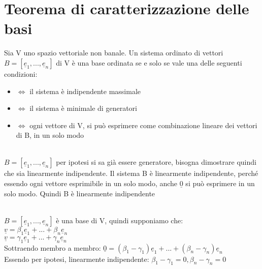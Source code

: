 \section{Teorema di caratterizzazione delle basi}
\begin{teorema}
	Sia V uno spazio vettoriale non banale. Un sistema ordinato di vettori $B=[\underline{e}_1,...,\underline{e}_n]$ di V è una base ordinata se e solo se vale una delle seguenti condizioni:
	\begin{itemize}
		\item $\Longleftrightarrow$ il sistema è indipendente massimale
		\item $\Longleftrightarrow$ il sistema è minimale di generatori
		\item $\Longleftrightarrow$ ogni vettore di V, si può esprimere come combinazione lineare dei vettori di B, in un solo modo
	\end{itemize}
	\begin{dimostrazione}
		\phantom{}\\
		$B=[\underline{e}_1,...,\underline{e}_n]$ per ipotesi si sa già essere generatore, bisogna dimostrare quindi che sia linearmente indipendente. Il sistema B è linearmente indipendente, perché essendo ogni vettore esprimibile in un solo modo, anche $\underline{0}$ si può esprimere in un solo modo. Quindi B è linearmente indipendente
	\end{dimostrazione}
	\begin{dimostrazione}
		\phantom{}\\
		$B=[\underline{e}_1,...,\underline{e}_n]$ è una base di V, quindi supponiamo che:\\
		$\underline{v}=\beta_1 \underline{e}_1+...+\beta_n \underline{e}_n$\\
		$\underline{v}=\gamma_1 \underline{e}_1+...+\gamma_n \underline{e}_n$\\
		Sottraendo membro a membro: $\underline{0}=(\beta_1-\gamma_1)\underline{e}_1+...+(\beta_n-\gamma_n)\underline{e}_n$\\
		Essendo per ipotesi, linearmente indipendente: $\beta_1-\gamma_1=0, \beta_n-\gamma_n=0$
	\end{dimostrazione}
\end{teorema}


